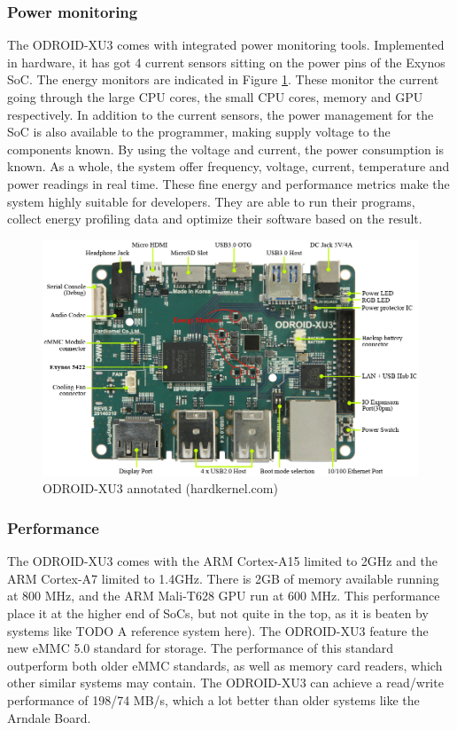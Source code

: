 \subsubsection{Power monitoring}
The ODROID-XU3 comes with integrated power monitoring tools.
Implemented in hardware, it has got 4 current sensors sitting on the power pins of the Exynos SoC.
The energy monitors are indicated in Figure \ref{overview-odroid}.
These monitor the current going through the large CPU cores, the small CPU cores, memory and GPU respectively.
In addition to the current sensors, the power management for the SoC is also available to the programmer, making supply voltage to the components known.
By using the voltage and current, the power consumption is known.
As a whole, the system offer frequency, voltage, current, temperature and power readings in real time.
These fine energy and performance metrics make the system highly suitable for developers.
They are able to run their programs, collect energy profiling data and optimize their software based on the result.

\begin{figure}[ht!]
  \centering
  \includegraphics[width=130mm]{fig/overview-odroid.jpg}
  \caption{ODROID-XU3 annotated (hardkernel.com\cite{hardkernel01})\label{overview-odroid}}
\end{figure}

\subsubsection{Performance}

The ODROID-XU3 comes with the ARM Cortex-A15 limited to 2GHz and the ARM Cortex-A7 limited to 1.4GHz.
There is 2GB of memory available running at 800 MHz, and the ARM Mali-T628 GPU run at 600 MHz.
This performance place it at the higher end of SoCs, but not quite in the top, as it is beaten by systems like TODO A reference system here).
The ODROID-XU3 feature the new eMMC 5.0 standard for storage.
The performance of this standard outperform both older eMMC standards, as well as memory card readers, which other similar systems may contain.
The ODROID-XU3 can achieve a read/write performance of 198/74 MB/s\cite{hardkernel01}, which a lot better than older systems like the Arndale Board.

